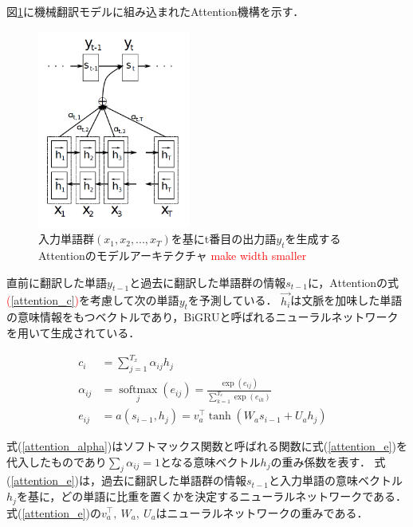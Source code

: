 \documentclass[12pt,a4j]{jreport}
\begin{document}
図\ref{fig_attention}に機械翻訳モデルに組み込まれたAttention機構を示す．

\begin{figure}[H]
	\centering
	\includegraphics[keepaspectratio, width=50mm]{img/attention.png}
	\caption{入力単語群$(x_1, x_2, ... , x_T)$を基にt番目の出力語$y_t$を生成するAttentionのモデルアーキテクチャ
  \protect\footnotemark[1]
  \textcolor{red}{make width smaller}
  }
	\label{fig_attention}
\end{figure}

直前に翻訳した単語$y_{t-1}$と過去に翻訳した単語群の情報$s_{t-1}$に，Attentionの式\textcolor{red}{(\ref{attention_c})}を考慮して次の単語$y_t$を予測している．
$\vec{h_i}$は文脈を加味した単語の意味情報をもつベクトルであり，BiGRUと呼ばれるニューラルネットワークを用いて生成されている．

\begin{align}
  c_{i} &= \sum_{j=1}^{T_{x}} \alpha_{i j} h_{j} &
  \label{attention_c}
  \\
  \alpha_{i j} &= \operatorname*{softmax}_j(e_{ij}) = \frac{\exp \left(e_{i j}\right)}{\sum_{k=1}^{T_{x}} \exp \left(e_{i k}\right)}
  \label{attention_alpha}
  \\
  e_{i j} &= a\left(s_{i-1}, h_{j}\right) = v_{a}^{\top} \tanh \left(W_{a} s_{i-1}+U_{a} h_{j}\right)
  \label{attention_e}
\end{align}

式(\ref{attention_alpha})はソフトマックス関数と呼ばれる関数に式(\ref{attention_e})を代入したものであり$\sum_j \alpha_{ij} = 1$となる意味ベクトル$h_j$の重み係数を表す．
式(\ref{attention_e})は，過去に翻訳した単語群の情報$s_{t-1}$と入力単語の意味ベクトル$h_j$を基に，どの単語に比重を置くかを決定するニューラルネットワークである．
式(\ref{attention_e})の$v_{a}^{\top},~ W_{a},~ U_{a}$はニューラルネットワークの重みである．
\end{document}

